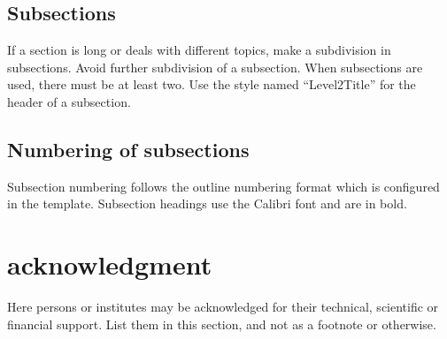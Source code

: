 \documentclass[onecolumn,notitlepage]{article}
\begin{document}

	

\subsection{Subsections} \label{sec:sub1}

If a section is long or deals with different topics, make a subdivision in subsections. Avoid further subdivision of a subsection. When subsections are used, there must be at least two. Use the style named ``Level2Title'' for the header of a subsection.

\subsection{Numbering of subsections}

Subsection numbering follows the outline numbering format which is configured in the template. Subsection headings use the Calibri font and are in bold.

\section*{acknowledgment} 

Here persons or institutes may be acknowledged for their technical, scientific or financial support. List them in this section, and not as a footnote or otherwise.
\end{document}
